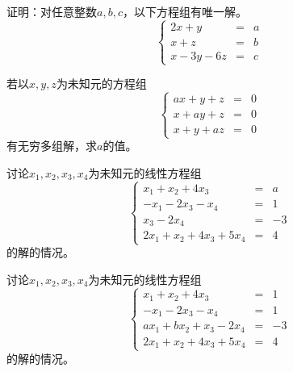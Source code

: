 \begin{ex} \label{ex:1.2}
证明：对任意整数$a,b,c$，以下方程组有唯一解。
$$\left\{ \begin{array}{rcl} 2x + y & = & a \\ x + z & = & b \\ x - 3y - 6z & = & c\end{array}\right.$$
\end{ex}

\begin{ex} \label{ex:1.3}
若以$x,y,z$为未知元的方程组
$$\left\{ \begin{array}{rcl} ax + y + z & = & 0 \\ x + ay + z & = & 0 \\ x + y + az & = & 0\end{array}\right.$$
有无穷多组解，求$a$的值。
\end{ex}

\begin{ex} \label{ex:1.4}
讨论$x_1,x_2,x_3,x_4$为未知元的线性方程组
$$\left\{ \begin{array}{rcl} x_1 + x_2 + 4x_3 & = & a \\ -x_1 - 2x_3 - x_4 & = & 1 \\ x_3 - 2x_4 & = & -3 \\ 2x_1 + x_2 + 4x_3 + 5x_4 & = & 4 \end{array}\right.$$
的解的情况。
\end{ex}

\begin{ex} \label{ex:1.5}
讨论$x_1,x_2,x_3,x_4$为未知元的线性方程组
$$\left\{ \begin{array}{rcl} x_1 + x_2 + 4x_3 & = & 1 \\ -x_1 - 2x_3 - x_4 & = & 1 \\ ax_1 + bx_2 + x_3 - 2x_4 & = & -3 \\ 2x_1 + x_2 + 4x_3 + 5x_4 & = & 4 \end{array}\right.$$
的解的情况。
\end{ex}

